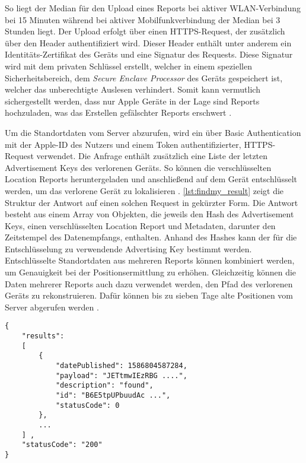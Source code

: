 So liegt der Median für den Upload eines Reports bei aktiver WLAN-Verbindung bei 15 Minuten während bei aktiver Mobilfunkverbindung der Median bei 3 Stunden liegt.
Der Upload erfolgt über einen HTTPS-Request, der zusätzlich über den Header authentifiziert wird.
Dieser Header enthält unter anderem ein Identitäts-Zertifikat des Geräts und eine Signatur des Requests.
Diese Signatur wird mit dem privaten Schlüssel erstellt, welcher in einem speziellen Sicherheitsbereich, dem \textit{Secure Enclave Processor} des Geräts gespeichert ist, welcher das unberechtigte Auslesen verhindert.
Somit kann vermutlich sichergestellt werden, dass nur Apple Geräte in der Lage sind Reports hochzuladen, was das Erstellen gefälschter Reports erschwert \cite{Heinrich_FindMy}.


Um die Standortdaten vom Server abzurufen, wird ein über Basic Authentication mit der Apple-ID des Nutzers und einem Token authentifizierter, HTTPS-Request verwendet.
Die Anfrage enthält zusätzlich eine Liste der letzten Advertisement Keys des verlorenen Geräts.
So können die verschlüsselten Location Reports heruntergeladen und anschließend auf dem Gerät entschlüsselt werden, um das verlorene Gerät zu lokalisieren \cite{Heinrich_FindMy}.
\autoref{lst:findmy_result} zeigt die Struktur der Antwort auf einen solchen Request in gekürzter Form.
Die Antwort besteht aus einem Array von Objekten, die jeweils den Hash des Advertisement Keys, einen verschlüsselten Location Report und Metadaten, darunter den Zeitstempel des Datenempfangs, enthalten.
Anhand des Hashes kann der für die Entschlüsselung zu verwendende Advertising Key bestimmt werden.
Entschlüsselte Standortdaten aus mehreren Reports können kombiniert werden, um Genauigkeit bei der Positionsermittlung zu erhöhen.
Gleichzeitig können die Daten mehrerer Reports auch dazu verwendet werden, den Pfad des verlorenen Geräts zu rekonstruieren.
Dafür können bis zu sieben Tage alte Positionen vom Server abgerufen werden \cite{Heinrich_FindMy}.

\begin{lstlisting}[label=lst:findmy_result,caption={Beispielhafte Antwort beim herunterladen von Location Reports\cite{Heinrich_FindMy}.}]
{
    "results": 
    [
        {
            "datePublished": 1586804587284,
            "payload": "JETtmwIEzRBG ....",
            "description": "found",
            "id": "B6E5tpUPbuudAc ...",
            "statusCode": 0
        },
        ...
    ] ,
    "statusCode": "200"
}
\end{lstlisting}